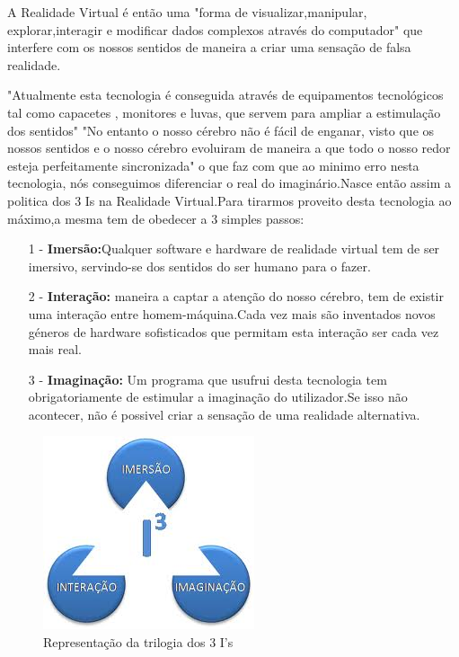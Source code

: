 	A Realidade Virtual é então uma "forma de visualizar,manipular, explorar,interagir e modificar dados complexos através do computador"\cite{8} que interfere com os nossos sentidos de maneira a criar uma sensação de falsa realidade.
	
	"Atualmente esta tecnologia é conseguida através de equipamentos tecnológicos tal como capacetes , monitores e luvas, que servem para ampliar a estimulação dos sentidos" \cite{9}
	"No entanto o nosso cérebro não é fácil de enganar, visto que os nossos sentidos e o nosso cérebro evoluiram de maneira a que todo o nosso redor esteja perfeitamente sincronizada" o que faz com que ao minimo erro nesta tecnologia, nós conseguimos diferenciar o real do imaginário.Nasce então assim a politica dos 3 Is na Realidade Virtual.Para tirarmos proveito desta tecnologia ao máximo,a mesma tem de obedecer a 3 simples passos:
	\begin{enumerate}
	\item[1]- \textbf{Imersão:}Qualquer software e hardware de realidade virtual tem de ser imersivo, servindo-se dos sentidos do ser humano para o fazer.
	\item[2]- \textbf{Interação:} maneira a captar a atenção do nosso cérebro, tem de existir uma interação entre homem-máquina.Cada vez mais são inventados novos géneros de hardware sofisticados que permitam esta interação ser cada vez mais real.
	\item[3]- \textbf{Imaginação:} Um programa que usufrui desta tecnologia tem obrigatoriamente de estimular a imaginação do utilizador.Se isso não acontecer, não é possivel criar a sensação de uma realidade alternativa.
	\end{enumerate}

	
	\begin{figure}
	\center
	\includegraphics[scale=0.5]{imagens/3is.jpg}
	\caption{Representação da trilogia dos 3 I's \cite{2}}
	\end{figure}
